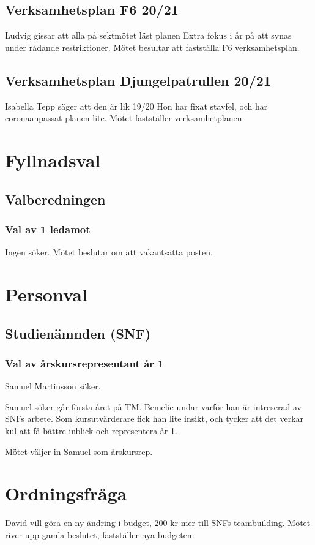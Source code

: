 \documentclass{sektionsmote}
\begin{document}
\subsection{Verksamhetsplan F6 20/21}
Ludvig gissar att alla på sektmötet läst planen
Extra fokus i år på att synas under rådande restriktioner.
Mötet besultar att fastställa F6 verksamhetsplan.

\subsection{Verksamhetsplan Djungelpatrullen 20/21}
Isabella Tepp säger att den är lik 19/20
Hon har fixat stavfel, och har coronaanpassat planen lite.
Mötet fastställer verksamhetplanen.


\section{Fyllnadsval}

\subsection{Valberedningen}

\subsubsection{Val av 1 ledamot}
Ingen söker.
Mötet beslutar om att vakantsätta posten.


\section{Personval}

\subsection{Studienämnden (SNF)}

\subsubsection{Val av årskursrepresentant år 1}
Samuel Martinsson söker.

Samuel söker går första året på TM.
Bemelie undar varför han är intreserad av SNFs arbete.
Som kursutvärderare fick han lite insikt, och tycker att det verkar kul att få bättre inblick och representera år 1.

Mötet väljer in Samuel som årskursrep.

\section*{Ordningsfråga} \label{uppriven-budget}
David vill göra en ny ändring i budget, 200 kr mer till SNFs teambuilding.
Mötet river upp gamla beslutet, fastställer nya budgeten.
\end{document}
